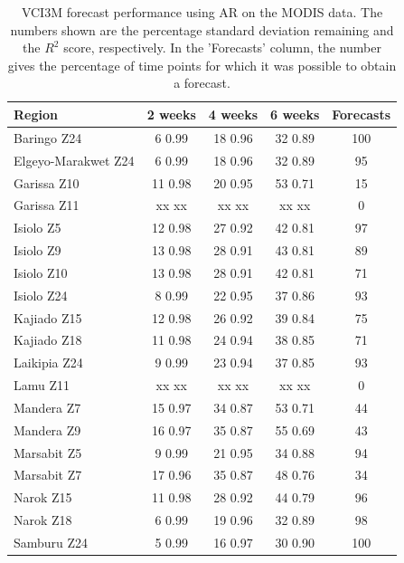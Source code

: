 \documentclass[review]{elsarticle}
\begin{document}
\begin{table}
	\footnotesize
	\caption{VCI3M forecast performance using AR on the MODIS data. The numbers shown are the percentage standard deviation remaining and the $R^2$ score, respectively. In the 'Forecasts' column, the number gives the percentage of time points for which it was possible to obtain a forecast.  } \label{tab:VCI3m_MODIS}
	\centering
	\begin{tabular}{l|ccc|c} 
		\toprule
		\textbf{Region}  &  \textbf{2 weeks} &  \textbf{4 weeks}  & \textbf{6 weeks} & \textbf{Forecasts} \\
		\midrule
		Baringo Z24 & 	6 	0.99 	& 	18 	0.96 	& 	32 	0.89 & 100\\
		Elgeyo-Marakwet Z24 &  6 	0.99 	& 	18 	0.96 	& 	32 	0.89 & 95 	\\
		Garissa Z10 &  11 	0.98 	& 	20 	0.95 	& 	53 	0.71 & 15	\\
		Garissa Z11 & xx xx & xx xx & xx xx & 0 \\
		Isiolo Z5 & 12 	0.98 	& 	27 	0.92 	& 	42 	0.81 & 97	 \\
		Isiolo Z9 &  13 	0.98 	& 	28 	0.91 	& 	43 	0.81 & 89	\\
		Isiolo Z10 & 13 	0.98 	& 	28 	0.91 	& 	42 	0.81 & 71\\
		Isiolo Z24 & 8 	0.99 	& 	22 	0.95 	& 	37 	0.86 & 93	\\
		Kajiado Z15 & 12 	0.98 	& 	26 	0.92 	& 	39 	0.84 & 75\\
		Kajiado Z18& 11 	0.98 	& 	24 	0.94 	& 	38 	0.85 & 71\\
		Laikipia Z24 & 9 	0.99 	& 	23 	0.94 	& 	37 	0.85 & 93	\\
		Lamu Z11 & xx xx & xx xx & xx xx & 0\\
		Mandera Z7 & 15 	0.97 	& 	34 	0.87 	& 	53 	0.71 & 44	\\
		Mandera Z9 & 16 	0.97 	& 	35 	0.87 	& 	55 	0.69 & 43	\\
		Marsabit Z5 & 9 	0.99 	& 	21 	0.95 	& 	34 	0.88 & 94\\
		Marsabit Z7 & 17 	0.96 	& 	35 	0.87 	& 	48 	0.76	& 34		\\
		Narok Z15 & 11 	0.98 	& 	28 	0.92 	& 	44 	0.79 & 96\\
		Narok Z18& 6 	0.99 	& 	19 	0.96 	& 	32 	0.89 & 98\\
		Samburu Z24 & 5 	0.99 	& 	16 	0.97 	& 	30 	0.90 & 100		\\

\end{tabular}
\end{table}
\end{document}
